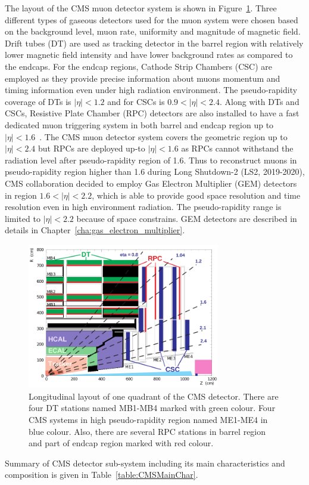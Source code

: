 The layout of the CMS muon detector system is shown in Figure~\ref{fig:muon-system-layout}. Three different types of gaseous detectors used for the muon system  were chosen based on the background level, muon rate, uniformity and magnitude of magnetic field. Drift tubes (DT) are used as tracking detector in the barrel region with relatively lower magnetic field intensity and have lower background rates as compared to the endcaps. 
For the endcap regions, Cathode Strip Chambers (CSC) are employed as they provide precise information about muons momentum and timing information even under high radiation environment.
The pseudo-rapidity coverage of DTs is $|\eta|<1.2$ and for CSCs is $0.9<|\eta|<2.4$. Along with DTs and CSCs, Resistive Plate Chamber (RPC) detectors are also installed to have a fast dedicated  muon triggering system in both barrel and endcap region up to $|\eta|<1.6$~\cite{muon-tdr}. The CMS muon detector system covers the geometric region up to $|\eta|<2.4$ but RPCs are deployed up-to $|\eta|<1.6$ as RPCs cannot withstand the radiation level after pseudo-rapidity region of 1.6. Thus to reconstruct muons in pseudo-rapidity region higher than 1.6 during Long Shutdown-2 (LS2, 2019-2020), CMS collaboration decided to employ Gas Electron Multiplier (GEM) detectors in region  $1.6<|\eta|<2.2$, which is able to provide good space resolution and time resolution even in high environment radiation. The pseudo-rapidity range is limited to $|\eta|<2.2$ because of space constrains. GEM  detectors are described in details in Chapter~\ref{cha:gas_electron_multiplier}.
\begin{figure}[!htbp]
	\centering
	\includegraphics[width=0.75\textwidth]{figures/LHC/pictures_MuonSys-mod3.png}
	\caption{Longitudinal layout of one quadrant of the CMS detector. There are four DT stations named MB1-MB4 marked with green colour. Four CMS systems in high pseudo-rapidity region named ME1-ME4 in blue colour. Also, there are several RPC stations in barrel region and part of endcap region marked with red colour.}
	\label{fig:muon-system-layout}
\end{figure}
Summary of CMS detector sub-system including its main characteristics and composition is given in Table~\ref{table:CMSMainChar}.


